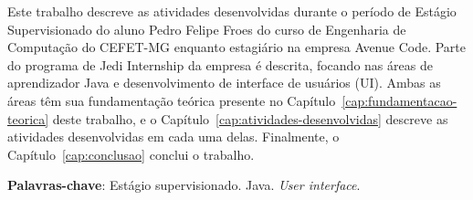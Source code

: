 \imprimircapa
\imprimirfolhaderosto*






\begin{resumo}
	Este trabalho descreve as atividades desenvolvidas durante o período de Estágio Supervisionado do aluno Pedro Felipe Froes do curso de Engenharia de Computação do CEFET-MG enquanto estagiário na empresa Avenue Code. Parte do programa de Jedi Internship da empresa é descrita, focando nas áreas de aprendizador Java e desenvolvimento de interface de usuários (UI). Ambas as áreas têm sua fundamentação teórica presente no Capítulo~\ref{cap:fundamentacao-teorica} deste trabalho, e o Capítulo~\ref{cap:atividades-desenvolvidas} descreve as atividades desenvolvidas em cada uma delas. Finalmente, o Capítulo~\ref{cap:conclusao} conclui o trabalho.
	
	\textbf{Palavras-chave}: Estágio supervisionado. Java. \textit{User interface}.
\end{resumo}


\listoffigures*
\cleardoublepage


